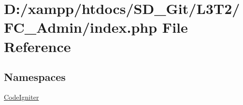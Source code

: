 \hypertarget{_admin_2index_8php}{}\section{D\+:/xampp/htdocs/\+S\+D\+\_\+\+Git/\+L3\+T2/\+F\+C\+\_\+\+Admin/index.php File Reference}
\label{_admin_2index_8php}
\subsection*{Namespaces}
\begin{DoxyCompactItemize}
\item 
 \hyperlink{namespace_code_igniter}{Code\+Igniter}
\end{DoxyCompactItemize}
